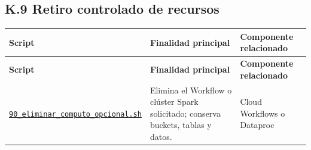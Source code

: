 \documentclass[11pt]{article}
\begin{document}
\subsection*{K.9 Retiro controlado de recursos}
\begingroup\scriptsize
\begin{longtable}{@{}>{\raggedright\arraybackslash}p{}>{\raggedright\arraybackslash}p{}>{\raggedright\arraybackslash}p{}@{}}
\toprule
\textbf{Script} & \textbf{Finalidad principal} & \textbf{Componente relacionado} \\
\midrule
\endfirsthead
\toprule
\textbf{Script} & \textbf{Finalidad principal} & \textbf{Componente relacionado} \\
\midrule
\endhead
\href{https://github.com/Codenid/lumina-retail-data-platform/blob/main/implementation/automatizacion/scripts90_eliminar_computo_opcional.sh}{\texttt{90\_\allowbreak{}eliminar\_\allowbreak{}computo\_\allowbreak{}opcional.sh}} & Elimina el Workflow o clúster Spark solicitado; conserva buckets, tablas y datos. & Cloud Workflows o Dataproc \\
\bottomrule
\end{longtable}
\endgroup
\end{document}
